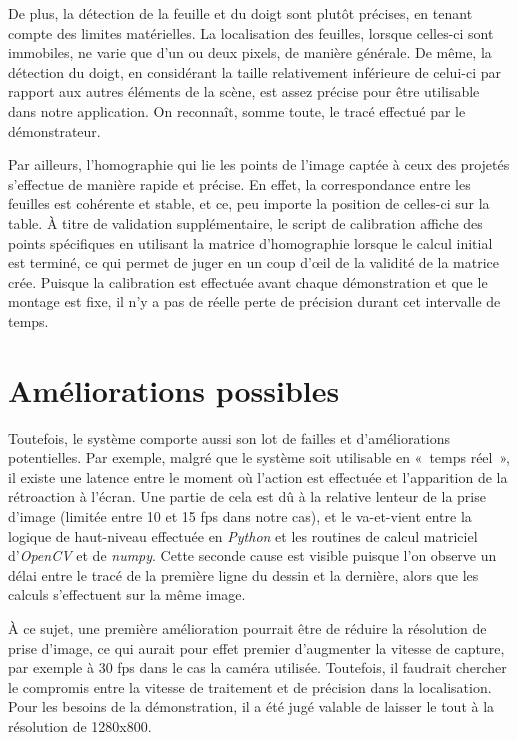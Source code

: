 \documentclass[11pt]{report}
\begin{document}
De plus, la détection de la feuille et du doigt sont plutôt précises, en
tenant compte des limites matérielles. La localisation des feuilles, lorsque
celles-ci sont immobiles, ne varie que d'un ou deux pixels, de manière générale.
De même, la détection du doigt, en considérant la taille relativement inférieure
de celui-ci par rapport aux autres éléments de la scène, est assez précise pour
être utilisable dans notre application. On reconnaît, somme toute, le tracé
effectué par le démonstrateur.

Par ailleurs, l'homographie qui lie les points de l'image captée à ceux des
projetés s'effectue de manière rapide et précise. En effet, la correspondance
entre les feuilles est cohérente et stable, et ce, peu importe la position de
celles-ci sur la table. À titre de validation supplémentaire, le script de
calibration affiche des points spécifiques en utilisant la matrice d'homographie
lorsque le calcul initial est terminé, ce qui permet de juger en un coup d'œil
de la validité de la matrice crée. Puisque la calibration est effectuée avant
chaque démonstration et que le montage est fixe, il n'y a pas de réelle perte de
précision durant cet intervalle de temps.


\section{Améliorations possibles}
Toutefois, le système comporte aussi son lot de failles et d'améliorations
potentielles. Par exemple, malgré que le système soit utilisable en « temps
réel », il existe une latence entre le moment où l'action est effectuée et
l'apparition de la rétroaction à l'écran. Une partie de cela est dû à la
relative lenteur de la prise d'image (limitée entre 10 et 15 fps dans notre
cas), et le va-et-vient entre la logique de haut-niveau effectuée en
\textit{Python} et les routines de calcul matriciel d'\textit{OpenCV} et de
\textit{numpy}. Cette seconde cause est visible puisque l'on observe un délai
entre le tracé de la première ligne du dessin et la dernière, alors que les
calculs s'effectuent sur la même image.

À ce sujet, une première amélioration pourrait être de réduire la résolution de
prise d'image, ce qui aurait pour effet premier d'augmenter la vitesse de
capture, par exemple à 30 fps dans le cas la caméra utilisée. Toutefois, il
faudrait chercher le compromis entre la vitesse de traitement et de précision
dans la localisation. Pour les besoins de la démonstration, il a été jugé
valable de laisser le tout à la résolution de 1280x800.
\end{document}
